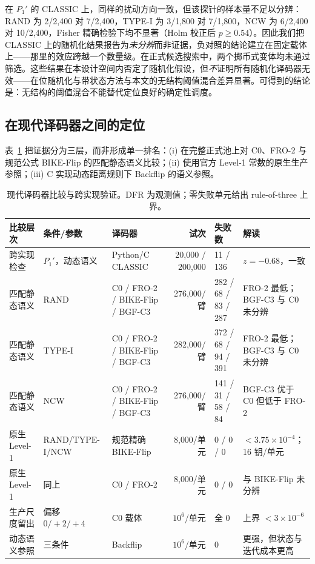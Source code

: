 \documentclass[UTF8,a4paper,10pt,twocolumn]{ctexart}
\begin{document}
在 $P_1'$ 的 CLASSIC 上，同样的扰动方向一致，但该探针的样本量不足以分辨：RAND 为 2/2{,}400 对 7/2{,}400，TYPE-I 为 3/1{,}800 对 7/1{,}800，NCW 为 6/2{,}400 对 10/2{,}400，Fisher 精确检验下均不显著（Holm 校正后 $p\ge 0.54$）。因此我们把 CLASSIC 上的随机化结果报告为\emph{未分辨}而非证据，负对照的结论建立在固定载体上——那里的效应跨越一个数量级。在正式候选搜索中，两个掷币式变体均未通过筛选。这些结果在本设计空间内否定了随机化假设，但\emph{不}证明所有随机化译码器无效——在位随机化与带状态方法与本文的无结构阈值混合差异显著\cite{baldi2021inplace}。可得到的结论是：无结构的阈值混合不能替代定位良好的确定性调度。

\subsection{在现代译码器之间的定位}\label{sec:modern}

表~\ref{tab:modern} 把证据分为三层，而非形成单一排名：(i) 在完整正式池上对 C0、FRO-2 与规范公式 BIKE-Flip 的匹配静态语义比较；(ii) 使用官方 Level-1 常数的原生生产参照；(iii) C 实现动态距离规则下 Backflip 的语义参照。

\begin{table}[t]
\centering
\caption{现代译码器比较与跨实现验证。DFR 为观测值；零失败单元给出 rule-of-three 上界。}
\label{tab:modern}
\begin{tabular}{@{}p{2.5cm}p{2.4cm}p{2.6cm}rp{1.5cm}p{4.4cm}@{}}
\toprule
比较层次 & 条件/参数 & 译码器 & 试次 & 失败数 & 解读 \\
\midrule
跨实现检查 & $P_1'$，动态语义 & Python/C CLASSIC & 20{,}000 / 200{,}000 & 11 / 136 & $z=-0.68$，一致 \\
\midrule
匹配静态语义 & RAND & C0 / FRO-2 / BIKE-Flip / BGF-C3 & 276{,}000/臂 & 282 / 68 / 83 / 287 & FRO-2 最低；BGF-C3 与 C0 未分辨\\
匹配静态语义 & TYPE-I & C0 / FRO-2 / BIKE-Flip / BGF-C3 & 282{,}000/臂 & 372 / 68 / 94 / 391 & FRO-2 最低；BGF-C3 与 C0 未分辨\\
匹配静态语义 & NCW & C0 / FRO-2 / BIKE-Flip / BGF-C3 & 276{,}000/臂 & 141 / 31 / 58 / 84 & BGF-C3 优于 C0 但低于 FRO-2\\
\midrule
原生 Level-1 & RAND/TYPE-I/NCW & 规范精确 BIKE-Flip & 8{,}000/单元 & 0 / 0 / 0 & $<3.75\times10^{-4}$；16 钥/单元 \\
原生 Level-1 & 同上 & C0 / FRO-2 & 8{,}000/单元 & 0 / 0 & 与 BIKE-Flip 未分辨 \\
\midrule
生产尺度留出 & 偏移 $0/+2/+4$ & C0 载体 & $10^6$/单元 & 全 0 & 上界 $<3\times10^{-6}$ \\
动态语义参照 & 三条件 & Backflip & $10^6$/单元 & 0 & 更强，但状态与迭代成本更高 \\
\bottomrule
\end{tabular}
\end{table}
\end{document}
